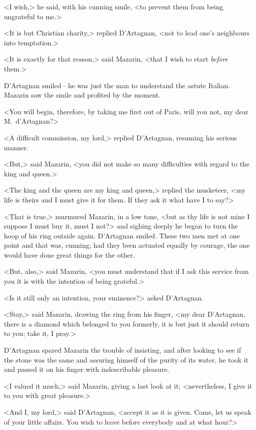 <I wish,> he said, with his cunning smile, <to prevent them from being ungrateful to me.>

<It is but Christian charity,> replied D'Artagnan, <not to lead one's neighbours into temptation.>

<It is exactly for that reason,> said Mazarin, <that I wish to start \emph{before} them.>

D'Artagnan smiled—he was just the man to understand the astute Italian. Mazarin saw the smile and profited by the moment.

<You will begin, therefore, by taking me first out of Paris, will you not, my dear M.~d'Artagnan?>

<A difficult commission, my lord,> replied D'Artagnan, resuming his serious manner.

<But,> said Mazarin, <you did not make so many difficulties with regard to the king and queen.>

<The king and the queen are my king and queen,> replied the musketeer, <my life is theirs and I must give it for them. If they ask it what have I to say?>

<That is true,> murmured Mazarin, in a low tone, <but as thy life is not mine I suppose I must buy it, must I not?> and sighing deeply he began to turn the hoop of his ring outside again. D'Artagnan smiled. These two men met at one point and that was, cunning; had they been actuated equally by courage, the one would have done great things for the other.

<But, also,> said Mazarin, <you must understand that if I ask this service from you it is with the intention of being grateful.>

<Is it still only an intention, your eminence?> asked D'Artagnan.

<Stay,> said Mazarin, drawing the ring from his finger, <my dear D'Artagnan, there is a diamond which belonged to you formerly, it is but just it should return to you; take it, I pray.>

D'Artagnan spared Mazarin the trouble of insisting, and after looking to see if the stone was the same and assuring himself of the purity of its water, he took it and passed it on his finger with indescribable pleasure.

<I valued it much,> said Mazarin, giving a last look at it; <nevertheless, I give it to you with great pleasure.>

<And I, my lord,> said D'Artagnan, <accept it as it is given. Come, let us speak of your little affairs. You wish to leave before everybody and at what hour?>

